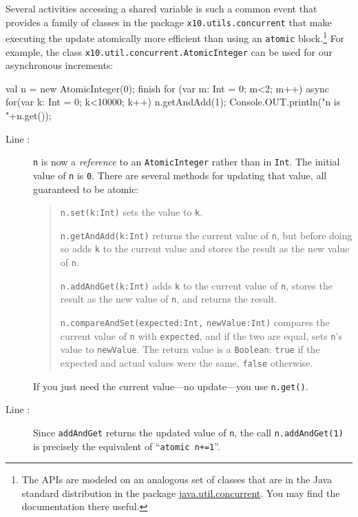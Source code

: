 Several activities accessing a shared variable is such a common event that \Xten{}
provides a family of classes in the package {\tt x10.utils.concurrent} that make
executing the update atomically more
efficient than using an {\tt atomic} block.\footnote{
The APIs are modeled on an analogous set of classes
that are in the Java standard distribution in the package 
\href{http://download.oracle.com/javase/1.5.0/docs/api/java/util/concurrent/atomic/package-summary.html}{java.util.concurrent}.  You may find the documentation there useful.
}
For example,
the class {\tt x10.util.concurrent.AtomicInteger} can be used for our asynchronous
increments:
\begin{xtennum}[]
val n = new AtomicInteger(0); 
finish for (var m: Int = 0; m<2; m++) {
    async for(var k: Int = 0; k<10000; k++) n.getAndAdd(1); 
}
Console.OUT.println("n is "+n.get());
\end{xtennum}
\begin{description}
\item[Line :]
{\tt n} is now a {\em  reference} to an {\tt AtomicInteger} rather than in {\tt Int}. 
The initial value of {\tt n} is {\tt 0}.  There are several methods for updating
that value, all guaranteed to be atomic:
\begin{quote}
{\tt n.set(k:Int)} sets the value to {\tt k}.

{\tt n.getAndAdd(k:Int)} returns the current value of {\tt n}, but before doing so
adds {\tt k} to the current value and stores the result as the new value of {\tt n}.

{\tt n.addAndGet(k:Int)} adds {\tt k} to the current value of {\tt n}, stores the
result as the new value of {\tt n}, and returns the result.

{\tt n.compareAndSet(expected:Int,} {\tt newValue:Int)} compares the current
value of {\tt n} with {\tt expected}, and if the two are equal, sets 
{\tt n}'s value to {\tt newValue}.  The return value is a {\tt Boolean}:
{\tt true} if the expected and actual values were the same, {\tt false}
otherwise.
\end{quote}
If you just need the current value---no update---you use {\tt n.get()}.
\item[Line :]
Since {\tt addAndGet} returns the updated value of {\tt n}, the call
{\tt n.addAndGet(1)} is precisely the equivalent of ``{\tt atomic n+=1}''.
\end{description}

